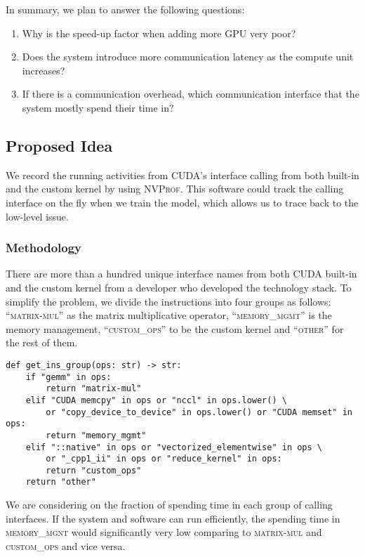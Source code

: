 In summary, we plan to answer the following questions:

\begin{enumerate}
\item Why is the speed-up factor when adding more GPU very poor?
\item Does the system introduce more communication latency as the compute unit increases?
\item If there is a communication overhead, which communication interface that the system mostly spend their time in?
\end{enumerate}


\subsection{Proposed Idea}

We record the running activities from CUDA's interface calling from both built-in and the custom kernel by using \textsc{NVProf}. This software could track the calling interface on the fly when we train the model, which allows us to trace back to the low-level issue.


\subsubsection{Methodology}

There are more than a hundred unique interface names from both CUDA built-in and the custom kernel from a developer who developed the technology stack. To simplify the problem, we divide the instructions into four groups as follows: ``\textsc{matrix-mul}'' as the matrix multiplicative operator, ``\textsc{memory\_mgmt}'' is the memory management, ``\textsc{custom\_ops}'' to be the custom kernel and ``\textsc{other}'' for the rest of them.

\begin{lstlisting}
def get_ins_group(ops: str) -> str:
    if "gemm" in ops:
        return "matrix-mul"
    elif "CUDA memcpy" in ops or "nccl" in ops.lower() \
        or "copy_device_to_device" in ops.lower() or "CUDA memset" in ops:
        return "memory_mgmt"
    elif "::native" in ops or "vectorized_elementwise" in ops \
        or "_cpp1_ii" in ops or "reduce_kernel" in ops:
        return "custom_ops"
    return "other"
\end{lstlisting}

We are considering on the fraction of spending time in each group of calling interfaces. If the system and software can run efficiently, the spending time in \textsc{memory\_mgnt} would significantly very low comparing to \textsc{matrix-mul} and \textsc{custom\_ops} and vice versa.

